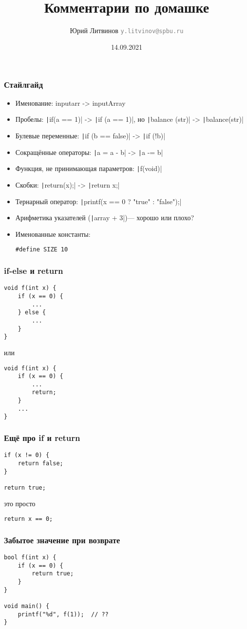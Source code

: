 \documentclass[xetex,mathserif,serif]{beamer}
\title{Комментарии по домашке}
\author[Юрий Литвинов]{Юрий Литвинов \newline \textcolor{gray}{\small\texttt{y.litvinov@spbu.ru}}}
\date{14.09.2021}
\begin{document}
    
    \frame{\titlepage}
    
    \begin{frame}[fragile]
        \frametitle{Стайлгайд}
        \begin{itemize}
            \item Именование: inputarr -> inputArray
            \item Пробелы: \texttt|if(a == 1)| -> \texttt|if (a == 1)|, но \texttt|balance (str)| -> \texttt|balance(str)|
            \item Булевые переменные: \texttt|if (b == false)| -> \texttt|if (!b)|
            \item Сокращённые операторы: \texttt|a = a - b| -> \texttt|a -= b|
            \item Функция, не принимающая параметров: \texttt|f(void)|
            \item Скобки: \texttt|return(x);| -> \texttt|return x;|
            \item Тернарный оператор: \texttt|printf(x == 0 ? "true" :  "false");|
            \item Арифметика указателей (\texttt|array + 3|)--- хорошо или плохо?
            \item Именованные константы: 
                \begin{verbatim}
#define SIZE 10
                \end{verbatim}
        \end{itemize}
    \end{frame}

    \begin{frame}[fragile]
        \frametitle{if-else и return}
        \begin{verbatim}
void f(int x) {
    if (x == 0) {
        ...
    } else {
        ...
    }
}
        \end{verbatim}
        или
        \begin{verbatim}
void f(int x) {
    if (x == 0) {
        ...
        return;
    } 
    ...
}
        \end{verbatim}
    \end{frame}

    \begin{frame}[fragile]
        \frametitle{Ещё про if и return}
        \begin{verbatim}
if (x != 0) {
    return false;
}

return true;
        \end{verbatim}
        \vspace{1cm}
        это просто
        \begin{verbatim}
return x == 0;
        \end{verbatim}
    \end{frame}

    \begin{frame}[fragile]
        \frametitle{Забытое значение при возврате}
        \begin{verbatim}
bool f(int x) {
    if (x == 0) {
        return true;
    }
}

void main() {
    printf("%d", f(1));  // ??
}
        \end{verbatim}
    \end{frame}
\end{document}
